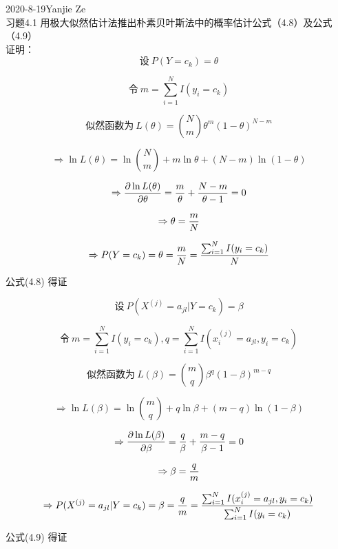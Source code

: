 \documentclass{article}
\begin{document}
	2020-8-19\qquad Yanjie Ze\\
	习题4.1 用极大似然估计法推出朴素贝叶斯法中的概率估计公式（4.8）及公式（4.9）\\
	证明：
	$$设\  P(Y=c_k)=\theta$$
	
	$$令\ \displaystyle m = \sum_{i=1}^{N}I(y_i=c_k)$$
	
	$$似然函数为\ L(\theta)={N \choose m}\theta^m(1-\theta)^{N-m}$$
	
	$$\Rightarrow \ln{L(\theta)}=\ln{N \choose m} + m\ln\theta + (N-m)\ln{(1-\theta)}  $$
	
	$$\Rightarrow {\partial\ln{L(\theta)}\over \partial \theta}={m \over \theta }+{N-m\over \theta-1 }=0$$
	
	$$\Rightarrow \theta = {m \over N}$$
	
	$$\Rightarrow P(Y=c_k)=\theta={m \over N}={\sum_{i=1}^{N}I(y_i=c_k)\over N}$$
	
	公式(4.8) 得证
	
	
	
	$$设\ P(X^{(j)}=a_{jl}\vert Y=c_k)=\beta$$
	
	$$令\ \displaystyle m=\sum_{i=1}^NI(y_i=c_k),q=\sum_{i=1}^NI(x_i^{(j)}=a_{jl},y_i=c_k)$$
	
	$$似然函数为\  L(\beta)={m \choose q}\beta^q(1-\beta)^{m-q} $$
	
	$$\Rightarrow \ln{L(\beta)}= \ln{m \choose q}+q\ln\beta+(m-q)\ln(1-\beta)$$
	
	$$\Rightarrow {\partial \ln{L(\beta)}\over \partial \beta }= {q \over \beta}+ {m-q \over \beta -1}=0$$
	
	$$\Rightarrow \beta={q\over m}$$
	
	$$\Rightarrow P(X^{(j)}=a_{jl}\vert Y=c_k)=\beta={q\over m}={\sum_{i=1}^NI(x_i^{(j)}=a_{jl},y_i=c_k)\over \sum_{i=1}^NI(y_i=c_k)}$$

	公式(4.9) 得证
\end{document}
